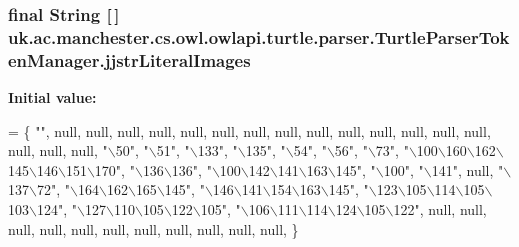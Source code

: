 \hypertarget{classuk_1_1ac_1_1manchester_1_1cs_1_1owl_1_1owlapi_1_1turtle_1_1parser_1_1_turtle_parser_token_manager_a941f3dd6940d4bd1bfc9aae65f4973b2}{
\subsubsection[{jjstr\-Literal\-Images}]{\setlength{\rightskip}{0pt plus 5cm}final String \mbox{[}$\,$\mbox{]} uk.\-ac.\-manchester.\-cs.\-owl.\-owlapi.\-turtle.\-parser.\-Turtle\-Parser\-Token\-Manager.\-jjstr\-Literal\-Images\hspace{0.3cm}{\ttfamily [static]}}}\label{classuk_1_1ac_1_1manchester_1_1cs_1_1owl_1_1owlapi_1_1turtle_1_1parser_1_1_turtle_parser_token_manager_a941f3dd6940d4bd1bfc9aae65f4973b2}
{\bfseries Initial value\-:}
\begin{DoxyCode}
= \{
\textcolor{stringliteral}{""}, null, null, null, null, null, null, null, null, null, null, null, null, 
null, null, null, null, null, \textcolor{stringliteral}{"\(\backslash\)50"}, \textcolor{stringliteral}{"\(\backslash\)51"}, \textcolor{stringliteral}{"\(\backslash\)133"}, \textcolor{stringliteral}{"\(\backslash\)135"}, \textcolor{stringliteral}{"\(\backslash\)54"}, \textcolor{stringliteral}{"\(\backslash\)56"}, \textcolor{stringliteral}{"\(\backslash\)73"}, 
\textcolor{stringliteral}{"\(\backslash\)100\(\backslash\)160\(\backslash\)162\(\backslash\)145\(\backslash\)146\(\backslash\)151\(\backslash\)170"}, \textcolor{stringliteral}{"\(\backslash\)136\(\backslash\)136"}, \textcolor{stringliteral}{"\(\backslash\)100\(\backslash\)142\(\backslash\)141\(\backslash\)163\(\backslash\)145"}, \textcolor{stringliteral}{"\(\backslash\)100"}, \textcolor{stringliteral}{"\(\backslash\)141"}, null, \textcolor{stringliteral}{"\(\backslash\)137\(\backslash\)72"}, 
\textcolor{stringliteral}{"\(\backslash\)164\(\backslash\)162\(\backslash\)165\(\backslash\)145"}, \textcolor{stringliteral}{"\(\backslash\)146\(\backslash\)141\(\backslash\)154\(\backslash\)163\(\backslash\)145"}, \textcolor{stringliteral}{"\(\backslash\)123\(\backslash\)105\(\backslash\)114\(\backslash\)105\(\backslash\)103\(\backslash\)124"}, \textcolor{stringliteral}{"\(\backslash\)127\(\backslash\)110\(\backslash\)105\(\backslash\)122\(\backslash\)105"}, 
\textcolor{stringliteral}{"\(\backslash\)106\(\backslash\)111\(\backslash\)114\(\backslash\)124\(\backslash\)105\(\backslash\)122"}, null, null, null, null, null, null, null, null, null, null, null, \}
\end{DoxyCode}
